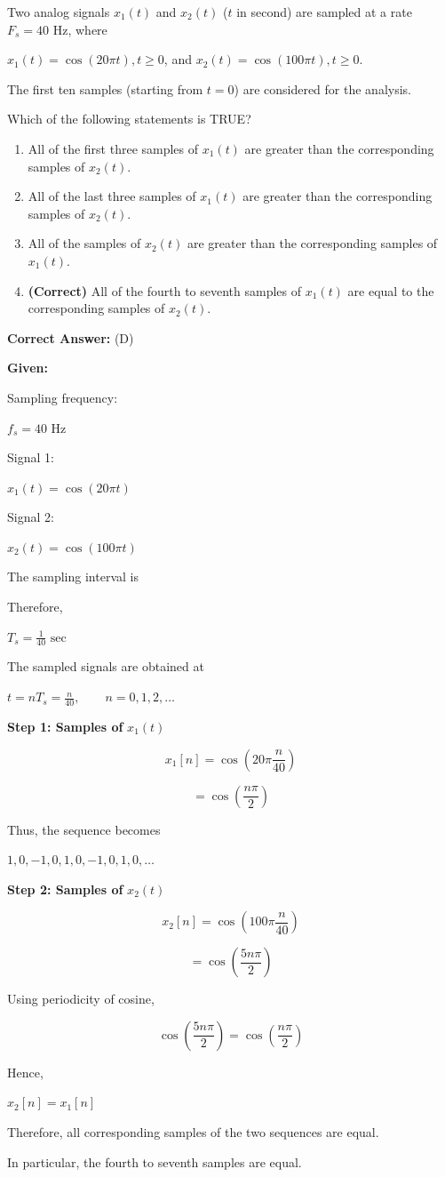 \documentclass[11pt,a4paper]{article}
\begin{document}
\noindent Two analog signals $x_1(t)$ and $x_2(t)$ ($t$ in second) are sampled at a rate $F_s = 40 \text{ Hz}$, where

 $x_1(t) = \cos(20\pi t), t \ge 0$, and $x_2(t) = \cos(100\pi t), t \ge 0$.

 The first ten samples (starting from $t = 0$) are considered for the analysis. 

Which of the following statements is TRUE?


\begin{enumerate}[label=(\Alph*)]
    \item All of the first three samples of $x_1(t)$ are greater than the corresponding samples of $x_2(t)$.
    \item All of the last three samples of $x_1(t)$ are greater than the corresponding samples of $x_2(t)$.
    \item All of the samples of $x_2(t)$ are greater than the corresponding samples of $x_1(t)$.
    \item \textbf{(Correct)} All of the fourth to seventh samples of $x_1(t)$ are equal to the corresponding samples of $x_2(t)$.
\end{enumerate}

\noindent \textbf{Correct Answer:} (D)

\begin{tcolorbox}[solbox, title=Detailed Solution -- Question 8]
\textbf{Given:}

Sampling frequency:

$f_s=40\text{ Hz}$

Signal 1:

$x_1(t)=\cos(20\pi t)$

Signal 2:

$x_2(t)=\cos(100\pi t)$

The sampling interval is

Therefore,

$T_s=\frac{1}{40}\text{ sec}$

The sampled signals are obtained at

$t=nT_s=\frac{n}{40}, \qquad n=0,1,2,\dots$

\textbf{Step 1: Samples of} $x_1(t)$

\[
x_1[n]
=
\cos\left(20\pi\frac{n}{40}\right)
\]

\[
=
\cos\left(\frac{n\pi}{2}\right)
\]

Thus, the sequence becomes

$1,0,-1,0,1,0,-1,0,1,0,\dots$

\textbf{Step 2: Samples of} $x_2(t)$

\[
x_2[n]
=
\cos\left(100\pi\frac{n}{40}\right)
\]

\[
=
\cos\left(\frac{5n\pi}{2}\right)
\]

Using periodicity of cosine,

\[
\cos\left(\frac{5n\pi}{2}\right)
=
\cos\left(\frac{n\pi}{2}\right)
\]

Hence,

$x_2[n]=x_1[n]$

Therefore, all corresponding samples of the two sequences are equal.

In particular, the fourth to seventh samples are equal.
\end{tcolorbox}
\end{document}
